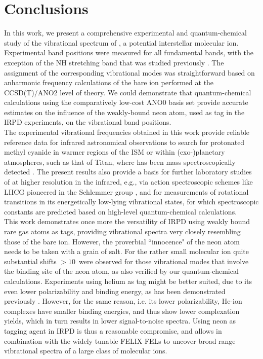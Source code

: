 \section{Conclusions}

In this work, we present a comprehensive experimental and quantum-chemical study of the vibrational spectrum of \pan, a potential interstellar molecular ion. Experimental band positions were measured for all fundamental bands, with the exception of the NH stretching band that was studied previously \cite{DRO1999,Amano1992}. The assignment of the corresponding vibrational modes was straightforward based on anharmonic frequency calculations of the bare ion performed at the CCSD(T)/ANO2 level of theory. We could demonstrate that quantum-chemical calculations using the comparatively low-cost ANO0 basis set provide accurate estimates on the influence of the weakly-bound neon atom, used as tag in the IRPD experiments, on the vibrational band positions.\\

The experimental vibrational frequencies obtained in this work provide reliable reference data for infrared astronomical observations to search for protonated methyl cyanide in warmer regions of the ISM or within (exo-)planetary atmospheres, such as that of Titan, where \pa has been mass spectroscopically detected \cite{VYA2006}. The present results also provide a basis for further laboratory studies of \pa at higher resolution in the infrared, e.g., via action spectroscopic schemes like LIICG pioneered in the Schlemmer group \cite{asvany_coltrap_2014,AYB2015}, and for measurements of rotational transitions in its energetically low-lying vibrational states, for which spectroscopic constants are predicted based on high-level quantum-chemical calculations.\\

This work demonstrates once more the versatility of IRPD using weakly bound rare gas atoms as tags, providing vibrational spectra very closely resembling those of the bare ion. However, the proverbial ``innocence" of the neon atom needs to be taken with a grain of salt. For the rather small \pa molecular ion quite substantial shifts $> 10$~\wnn were observed for those vibrational modes that involve the binding site of the neon atom, as also verified by our quantum-chemical calculations. Experiments using helium as tag might be better suited, due to its even lower polarizability and binding energy, as has been demonstrated previously \cite{BKS2003,Dopfer2003,Jasik2013,jusko_felion_2019}. However, for the same reason, i.e. its lower polarizability, He-ion complexes have smaller binding energies, and thus show lower complexation yields, which in turn results in  lower signal-to-noise spectra. Using neon as tagging agent in IRPD is thus a reasonable compromise, and allows in combination with the widely tunable FELIX FELs to uncover broad range vibrational spectra of a large class of molecular ions.
    

